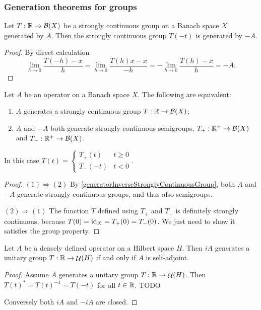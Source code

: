 \subsubsection{Generation theorems for groups}
\begin{lemma} \label{generatorInverseStronglyContinuousGroup}
Let $T: \mathbb{R}\to \operatorname{\mathcal{B}}(X)$ be a strongly continuous group on a Banach space $X$ generated by $A$. Then the strongly continuous group $T(-t)$ is generated by $-A$.
\end{lemma}
\begin{proof}
By direct calculation
\[ \lim_{h\to 0} \frac{T(-h) - x}{h} = \lim_{h\to 0} \frac{T(h)x - x}{-h} = -\lim_{h\to 0} \frac{T(h) - x}{h} = -A. \]
\end{proof}

\begin{proposition}
Let $A$ be an operator on a Banach space $X$. The following are equivalent:
\begin{enumerate}
\item $A$ generates a strongly continuous group $T: \mathbb{R}\to \operatorname{\mathcal{B}}(X)$;
\item $A$ and $-A$ both generate strongly continuous semigroups, $T_+: \mathbb{R}^+\to \operatorname{\mathcal{B}}(X)$ and $T_-: \mathbb{R}^+\to \operatorname{\mathcal{B}}(X)$.
\end{enumerate}
In this case $T(t) = \begin{cases}
T_+(t) & t \geq 0 \\ T_-(-t) & t<0
\end{cases}$.
\end{proposition}
\begin{proof}
$(1) \Rightarrow (2)$ By \ref{generatorInverseStronglyContinuousGroup}, both $A$ and $-A$ generate strongly continuous groups, and thus also semigroups.

$(2) \Rightarrow (1)$ The function $T$ defined using $T_+$ and $T_-$ is definitely strongly continuous, because $T(0) = \operatorname{id}_X = T_+(0) = T_-(0)$. We just need to show it satisfies the group property.
\end{proof}

\begin{theorem}
Let $A$ be a densely defined operator on a Hilbert space $H$. Then $iA$ generates a unitary group $T: \mathbb{R} \to \mathop{\mathcal{U}}\nolimits(H)$ \textup{if and only if} $A$ is self-adjoint.
\end{theorem}
\begin{proof}
Assume $A$ generates a unitary group $T: \mathbb{R} \to \mathop{\mathcal{U}}\nolimits(H)$. Then $T(t)^* = T(t)^{-1} = T(-t)$ for all $t\in \mathbb{R}$. TODO

Conversely both $iA$ and $-iA$ are closed.
\end{proof}

